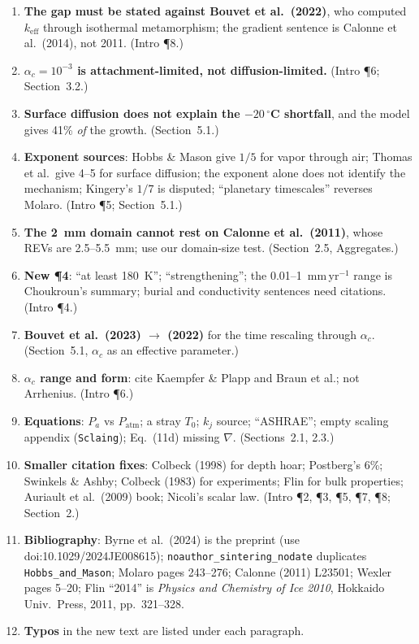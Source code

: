 \documentclass[11pt]{article}
\newcommand{\add}[1]{\textcolor{chk}{#1}}
\begin{document}
\begin{enumerate}[label=\textbf{F\arabic*},leftmargin=2.2em]
\item \add{\textbf{The gap must be stated against Bouvet et al.\ (2022)}, who
  computed $k_{\mathrm{eff}}$ through isothermal metamorphism; the gradient
  sentence is Calonne et al.\ (2014), not 2011. (Intro \P8.)}
\item \add{\textbf{$\alpha_c = 10^{-3}$ is attachment-limited, not
  diffusion-limited.} (Intro \P6; Section~3.2.)}
\item \add{\textbf{Surface diffusion does not explain the $-20\,^\circ$C
  shortfall}, and the model gives 41\% \emph{of} the growth. (Section~5.1.)}
\item \add{\textbf{Exponent sources}: Hobbs \& Mason give $1/5$ for vapor
  through air; Thomas et al.\ give 4--5 for surface diffusion; the exponent
  alone does not identify the mechanism; Kingery's $1/7$ is disputed;
  ``planetary timescales'' reverses Molaro. (Intro \P5; Section~5.1.)}
\item \add{\textbf{The 2~mm domain cannot rest on Calonne et al.\ (2011)},
  whose REVs are 2.5--5.5~mm; use our domain-size test. (Section~2.5,
  Aggregates.)}
\item \add{\textbf{New \P4}: ``at least 180~K''; ``strengthening''; the
  0.01--1~mm\,yr$^{-1}$ range is Choukroun's summary; burial and
  conductivity sentences need citations. (Intro \P4.)}
\item \add{\textbf{Bouvet et al.\ (2023) $\to$ (2022)} for the time
  rescaling through $\alpha_c$. (Section~5.1, $\alpha_c$ as an effective
  parameter.)}
\item \add{\textbf{$\alpha_c$ range and form}: cite Kaempfer \& Plapp and
  Braun et al.; not Arrhenius. (Intro \P6.)}
\item \add{\textbf{Equations}: $P_a$ vs $P_{\mathrm{atm}}$; a stray $T_0$;
  $k_j$ source; ``ASHRAE''; empty scaling appendix (\texttt{Sclaing});
  Eq.~(11d) missing $\nabla$. (Sections~2.1, 2.3.)}
\item \add{\textbf{Smaller citation fixes}: Colbeck (1998) for depth hoar;
  Postberg's 6\%; Swinkels \& Ashby; Colbeck (1983) for experiments; Flin
  for bulk properties; Auriault et al.\ (2009) book; Nicoli's scalar law.
  (Intro \P2, \P3, \P5, \P7, \P8; Section~2.)}
\item \add{\textbf{Bibliography}: Byrne et al.\ (2024) is the preprint (use
  doi:10.1029/2024JE008615); \texttt{noauthor\_sintering\_nodate} duplicates
  \texttt{Hobbs\_and\_Mason}; Molaro pages 243--276; Calonne (2011) L23501;
  Wexler pages 5--20; Flin ``2014'' is \emph{Physics and Chemistry of Ice
  2010}, Hokkaido Univ.\ Press, 2011, pp.~321--328.}
\item \add{\textbf{Typos} in the new text are listed under each paragraph.}
\end{enumerate}
\end{document}

